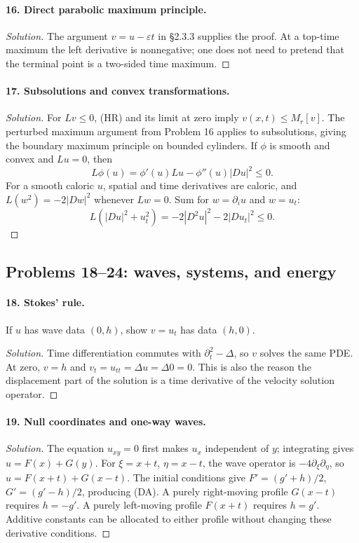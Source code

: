 \paragraph{16. Direct parabolic maximum principle.}
\begin{proof}[Solution]
The argument $v=u-\varepsilon t$ in \S2.3.3 supplies the proof.
At a top-time maximum the left derivative is nonnegative; one does not
need to pretend that the terminal point is a two-sided time maximum.
\end{proof}

\paragraph{17. Subsolutions and convex transformations.}
\begin{proof}[Solution]
For $Lv\leq0$, (HR) and its limit at zero imply $v(x,t)\leq M_r[v]$.
The perturbed maximum argument from Problem 16 applies to subsolutions,
giving the boundary maximum principle on bounded cylinders.
If $\phi$ is smooth and convex and $Lu=0$, then
\[
 L\phi(u)=\phi'(u)Lu-\phi''(u)|Du|^2\leq0.
\]
For a smooth caloric $u$, spatial and time derivatives are caloric,
and $L(w^2)=-2|Dw|^2$ whenever $Lw=0$.
Sum for $w=\partial_i u$ and $w=u_t$:
\[
 L(|Du|^2+u_t^2)=-2|D^2u|^2-2|Du_t|^2\leq0.
\]
\end{proof}
\Needspace{45mm}

\subsection{Problems 18--24: waves, systems, and energy}
\paragraph{18. Stokes' rule.}
If $u$ has wave data $(0,h)$, show $v=u_t$ has data $(h,0)$.
\begin{proof}[Solution]
Time differentiation commutes with $\partial_t^2-\Delta$, so $v$ solves
the same PDE. At zero, $v=h$ and
$v_t=u_{tt}=\Delta u=\Delta0=0$. This is also the reason the displacement
part of the solution is a time derivative of the velocity solution operator.
\end{proof}

\paragraph{19. Null coordinates and one-way waves.}
\begin{proof}[Solution]
The equation $u_{xy}=0$ first makes $u_x$ independent of $y$;
integrating gives $u=F(x)+G(y)$.
For $\xi=x+t$, $\eta=x-t$, the wave operator is
$-4\partial_\xi\partial_\eta$, so
$u=F(x+t)+G(x-t)$. The initial conditions give
$F'=(g'+h)/2$, $G'=(g'-h)/2$, producing (DA).
A purely right-moving profile $G(x-t)$ requires $h=-g'$.
A purely left-moving profile $F(x+t)$ requires $h=g'$.
Additive constants can be allocated to either profile without changing
these derivative conditions.
\end{proof}

